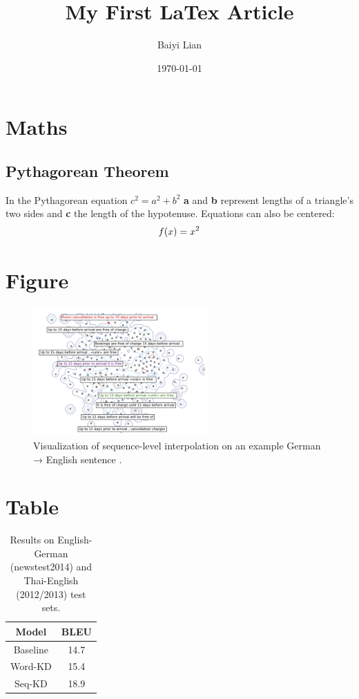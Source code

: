 \documentclass{article}
\title{My First LaTex Article}
\author{Baiyi Lian}
\date{\today}
\newcommand{\startPageNumbering}{\pagenumbering{arabic}\setcounter{page}{1}} %
\begin{document}
\maketitle
\newpage

\tableofcontents
\newpage

\startPageNumbering

\section{Maths}
\subsection{Pythagorean Theorem}
In the Pythagorean equation $c^2 = a^2 + b^2$ \textbf{a} and \textbf{b} represent lengths of a triangle's two sides and \textbf{c} the length of the hypotenuse. Equations can also be centered:
\[
\centering
f(x) = x^2
\]

\section{Figure}

\begin{figure}[h!]
    \centering
    \includegraphics[width=0.6\textwidth]{figure1.png} %
    \caption{Visualization of sequence-level interpolation on an
example German → English sentence \cite{kim-rush-2016-sequence}.}
    \label{fig:seq}
\end{figure}

\section{Table}

\begin{table}[h!]
    \centering
    
    \begin{tabular}{c|c}
        \hline
        Model & BLEU \\
        \hline
        Baseline & 14.7 \\
        \hline
        Word-KD & 15.4 \\
        \hline
        Seq-KD & 18.9

    \end{tabular}
    \caption{Results on English-German (newstest2014) and Thai-English (2012/2013) test sets.}
\end{table}
\end{document}
